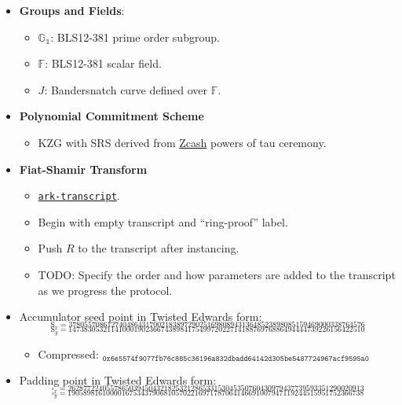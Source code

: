 \documentclass[
]{article}
\providecommand{\tightlist}{%
  \setlength{\itemsep}{0pt}\setlength{\parskip}{0pt}}
\begin{document}
\begin{itemize}
\item
  \textbf{Groups and Fields}:

  \begin{itemize}
  \tightlist
  \item
    \(\mathbb{G_1}\): BLS12-381 prime order subgroup.
  \item
    \(\mathbb{F}\): BLS12-381 scalar field.
  \item
    \(J\): Bandersnatch curve defined over \(\mathbb{F}\).
  \end{itemize}
\item
  \textbf{Polynomial Commitment Scheme}

  \begin{itemize}
  \tightlist
  \item
    KZG with SRS derived from
    \href{https://zfnd.org/conclusion-of-the-powers-of-tau-ceremony}{Zcash}
    powers of tau ceremony.
  \end{itemize}
\item
  \textbf{Fiat-Shamir Transform}

  \begin{itemize}
  \tightlist
  \item
    \href{https://crates.io/crates/ark-transcript}{\texttt{ark-transcript}}.
  \item
    Begin with empty transcript and ``ring-proof'' label.
  \item
    Push \(R\) to the transcript after instancing.
  \item
    TODO: Specify the order and how parameters are added to the
    transcript as we progress the protocol.
  \end{itemize}
\item
  Accumulator seed point in Twisted Edwards form:
  \[_{\text{S}_x = 37805570861274048643170021838972902516980894313648523898085159469000338764576}\]
  \[_{\text{S}_y = 14738305321141000190236674389841754997202271418876976886494444739226156422510}\]

  \begin{itemize}
  \tightlist
  \item
    Compressed:
    \(_{\texttt{0x6e5574f9077fb76c885c36196a832dbadd64142d305be5487724967acf9595a0}}\)
  \end{itemize}
\item
  Padding point in Twisted Edwards form:
  \[_{\square_x = 26287722405578650394504321825321286533153045350760430979437739593351290020913}\]
  \[_{\square_y = 19058981610000167534379068105702216971787064146691007947119244515951752366738}\]


\end{itemize}
\end{document}
